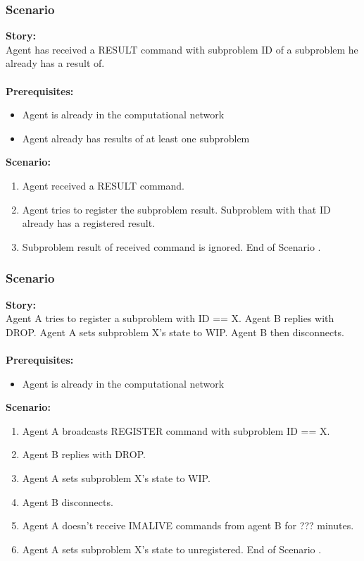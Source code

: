 \documentclass{article}
\begin{document}
\subsubsection{Scenario }
\noindent\textbf{Story:} \\
Agent has received a RESULT command with subproblem ID of a subproblem he already has a result of. \\\\
\textbf{Prerequisites:}
\begin{itemize}
    \item Agent is already in the computational network
    \item Agent already has results of at least one subproblem
\end{itemize}
\textbf{Scenario:}
\begin{enumerate}
    \item Agent received a RESULT command.
    \item Agent tries to register the subproblem result. Subproblem with that ID already has a registered result.
    \item Subproblem result of received command is ignored. End of Scenario .
\end{enumerate}

\subsubsection{Scenario }
\noindent\textbf{Story:} \\
Agent A tries to register a subproblem with ID == X. Agent B replies with DROP. Agent A sets subproblem X's state to WIP. Agent B then disconnects. \\\\
\textbf{Prerequisites:}
\begin{itemize}
    \item Agent is already in the computational network
\end{itemize}
\textbf{Scenario:}
\begin{enumerate}
    \item Agent A broadcasts REGISTER command with subproblem ID == X.
    \item Agent B replies with DROP.
    \item Agent A sets subproblem X's state to WIP.
    \item Agent B disconnects.
    \item Agent A doesn't receive IMALIVE commands from agent B for ??? minutes.
    \item Agent A sets subproblem X's state to unregistered. End of Scenario .
\end{enumerate}
\end{document}
